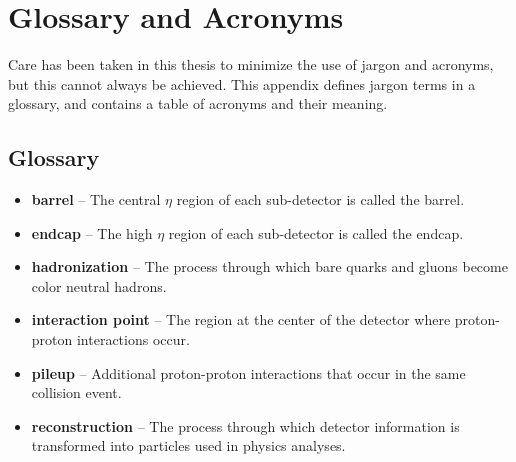 \chapter{Glossary and Acronyms}
\label{app_glossary}
Care has been taken in this thesis to minimize the use of jargon and
acronyms, but this cannot always be achieved.  This appendix defines
jargon terms in a glossary, and contains a table of acronyms and their
meaning.

\section{Glossary}
\label{jargonapp}
\begin{itemize}

	\item \textbf{barrel} -- The central $\eta$ region of each sub-detector is 
		called the barrel.
	\item \textbf{endcap} -- The high $\eta$ region of each sub-detector is 
		called the endcap.
	\item \textbf{hadronization} -- The process through which bare quarks and 
		gluons become color neutral hadrons.
	\item \textbf{interaction point} -- The region at the center of the detector 
		where proton-proton interactions occur.
	\item \textbf{pileup} -- Additional proton-proton interactions that occur 
		in the same collision event.
	\item \textbf{reconstruction} -- The process through which detector information 
		is transformed into particles used in physics analyses.
\end{itemize}

